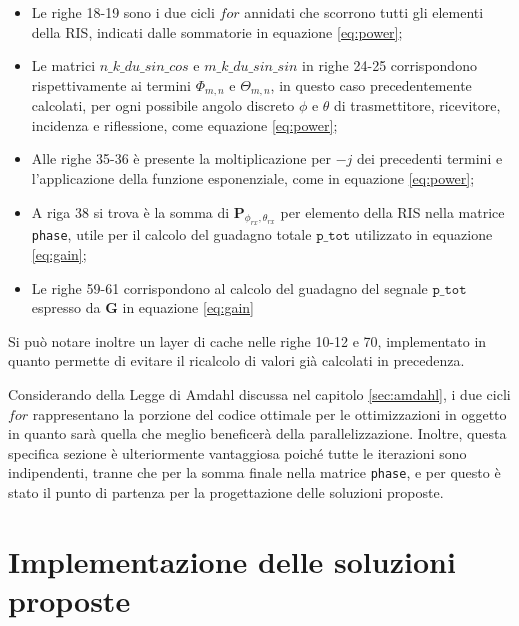 \begin{itemize}
  \item Le righe 18-19 sono i due cicli $for$ annidati che scorrono tutti gli elementi
    della RIS, indicati dalle sommatorie in equazione \ref{eq:power};

  \item Le matrici $n\_k\_du\_sin\_cos$ e $m\_k\_du\_sin\_sin$ in righe 24-25 corrispondono
    rispettivamente ai termini $\Phi_{m,n}$ e $\Theta_{m,n}$, in questo caso
    precedentemente calcolati, per ogni possibile angolo discreto $\phi$ e $\theta$
    di trasmettitore, ricevitore, incidenza e riflessione, come equazione
    \ref{eq:power};

  \item Alle righe 35-36 è presente la moltiplicazione per $-j$ dei precedenti termini
    e l'applicazione della funzione esponenziale, come in equazione
    \ref{eq:power};

  \item A riga 38 si trova è la somma di $\textbf{P}_{\phi_{rx},\theta_{rx}}$ per
    elemento della RIS nella matrice \texttt{phase}, utile per il calcolo del guadagno
    totale $\texttt{p\_tot}$ utilizzato in equazione \ref{eq:gain};

  \item Le righe 59-61 corrispondono al calcolo del guadagno del segnale $\texttt
    {p\_tot}$ espresso da $\textbf{G}$ in equazione \ref{eq:gain}
\end{itemize}

Si può notare inoltre un layer di cache nelle righe 10-12 e 70, implementato in
quanto permette di evitare il ricalcolo di valori già calcolati in precedenza.

Considerando della Legge di Amdahl discussa nel capitolo \ref{sec:amdahl}, i due
cicli $for$ rappresentano la porzione del codice ottimale per le ottimizzazioni in
oggetto in quanto sarà quella che meglio beneficerà della parallelizzazione.
Inoltre, questa specifica sezione è ulteriormente vantaggiosa poiché tutte le iterazioni
sono indipendenti, tranne che per la somma finale nella matrice \texttt{phase},
e per questo è stato il punto di partenza per la progettazione delle soluzioni
proposte.

\section{Implementazione delle soluzioni proposte}
\label{sec:implementazione}

